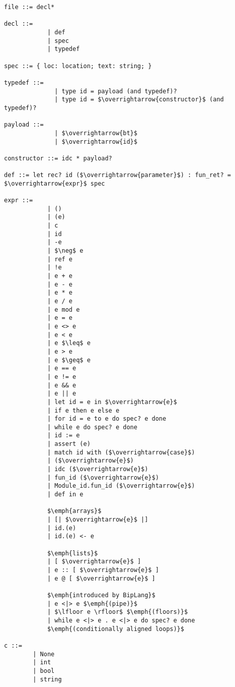 \begin{lstlisting}[mathescape, basicstyle=\ttfamily, columns=flexible,
                    emph={type, and, let, rec, if, then, else, mod, in, for, while, do, done, to, begin, end, assert, match, with, of, open, include,ref},
                    emphstyle=\ttfamily\bfseries\color{myorange}]
file ::= decl*

decl ::= 
            | def
            | spec
            | typedef

spec ::= { loc: location; text: string; }

typedef ::=
              | type id = payload (and typedef)?
              | type id = $\overrightarrow{constructor}$ (and typedef)?

payload ::= 
              | $\overrightarrow{bt}$
              | $\overrightarrow{id}$

constructor ::= idc * payload?

def ::= let rec? id ($\overrightarrow{parameter}$) : fun_ret? = $\overrightarrow{expr}$ spec

expr ::=
            | ()
            | (e)
            | c
            | id
            | -e
            | $\neg$ e
            | ref e 
            | !e
            | e + e
            | e - e
            | e * e
            | e / e
            | e mod e
            | e = e
            | e <> e
            | e < e
            | e $\leq$ e
            | e > e
            | e $\geq$ e
            | e == e
            | e != e
            | e && e
            | e || e 
            | let id = e in $\overrightarrow{e}$
            | if e then e else e
            | for id = e to e do spec? e done 
            | while e do spec? e done 
            | id := e
            | assert (e)
            | match id with ($\overrightarrow{case}$)
            | ($\overrightarrow{e}$)
            | idc ($\overrightarrow{e}$)
            | fun_id ($\overrightarrow{e}$)
            | Module_id.fun_id ($\overrightarrow{e}$)
            | def in e
            
            $\emph{arrays}$
            | [| $\overrightarrow{e}$ |]
            | id.(e)
            | id.(e) <- e

            $\emph{lists}$
            | [ $\overrightarrow{e}$ ]
            | e :: [ $\overrightarrow{e}$ ]
            | e @ [ $\overrightarrow{e}$ ]

            $\emph{introduced by BipLang}$
            | e <|> e $\emph{(pipe)}$
            | $\lfloor e \rfloor$ $\emph{(floors)}$
            | while e <|> e . e <|> e do spec? e done
            $\emph{(conditionally aligned loops)}$

c ::=
        | None
        | int
        | bool
        | string

\end{lstlisting}

